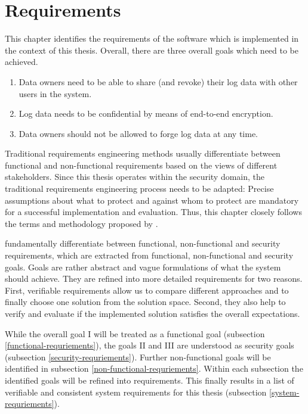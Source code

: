\documentclass[../main.tex]{subfiles}
\begin{document}
\chapter{Requirements}

This chapter identifies the requirements of the software which is implemented in the context of this thesis.
Overall, there are three overall goals which need to be achieved. 

\begin{enumerate}[label=\Roman*.]
    \item Data owners need to be able to share (and revoke) their log data with other users in the system.
	\item Log data needs to be confidential by means of end-to-end encryption.
    \item Data owners should not be allowed to forge log data at any time.
\end{enumerate}


Traditional requirements engineering methods usually differentiate between functional and non-functional requirements based on the views of different stakeholders.
Since this thesis operates within the security domain, the traditional requirements engineering process needs to be adapted: 
Precise assumptions about what to protect and against whom to protect are mandatory for a successful implementation and evaluation.
Thus, this chapter closely follows the terms and methodology proposed by \citeauthor{Fabian2010} \cite{Fabian2010}.

\citeauthor{Fabian2010} fundamentally differentiate between functional, non-functional and security requirements, which are extracted from functional, non-functional and security goals.
Goals are rather abstract and vague formulations of what the system should achieve. 
They are refined into more detailed requirements for two reasons.
First, verifiable requirements allow us to compare different approaches and to finally choose one solution from the solution space. 
Second, they also help to verify and evaluate if the implemented solution satisfies the overall expectations. \cite{Fabian2010}

While the overall goal I will be treated as a functional goal (subsection \ref{functional-requriements}), the goals II and III are understood as security goals (subsection \ref{security-requriements}).
Further non-functional goals will be identified in subsection \ref{non-functional-requriements}.
Within each subsection the identified goals will be refined into requirements.
This finally results in a list of verifiable and consistent system requirements for this thesis (subsection \ref{system-requriements}).
\end{document}
